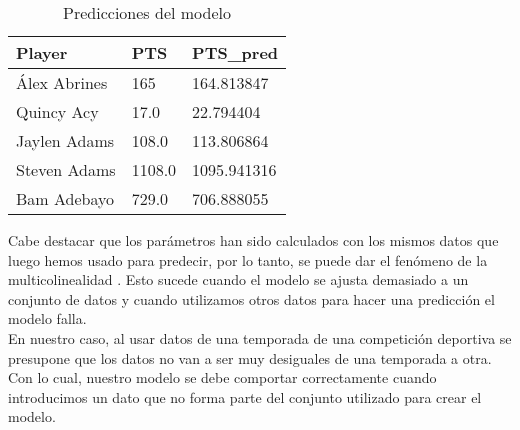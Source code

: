 \documentclass[11pt]{diazessay} %
\begin{document}
\begin{table}[!h]
	\centering
	\begin{tabular}{|l|l|l|}
		\hline
		\textbf{Player} & \textbf{PTS} & \textbf{PTS\_pred} \\ \hline
		Álex Abrines    & 165          & 164.813847         \\ \hline
		Quincy Acy      & 17.0         & 22.794404          \\ \hline
		Jaylen Adams    & 108.0        & 113.806864         \\ \hline
		Steven Adams    & 1108.0       & 1095.941316        \\ \hline
		Bam Adebayo     & 729.0        & 706.888055         \\ \hline
	\end{tabular}
	\caption{Predicciones del modelo}
	\label{pred}
\end{table}

Cabe destacar que los parámetros han sido calculados con los mismos datos que luego hemos usado para predecir, por lo tanto, se puede dar el fenómeno de la multicolinealidad \cite{multicol}. Esto sucede cuando el modelo se ajusta demasiado a un conjunto de datos y cuando utilizamos otros datos para hacer una predicción el modelo falla. \\

En nuestro caso, al usar datos de una temporada de una competición deportiva se presupone que los datos no van a ser muy desiguales de una temporada a otra. Con lo cual, nuestro modelo se debe comportar correctamente cuando introducimos un dato que no forma parte del conjunto utilizado para crear el modelo.

\newpage
\end{document}
